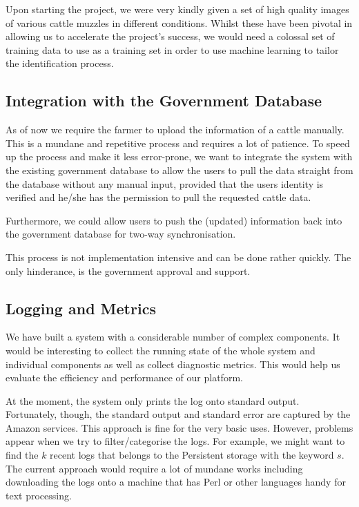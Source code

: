 Upon starting the project, we were very kindly given a set of high quality images of various cattle muzzles in different conditions. Whilst these have been pivotal in allowing us to accelerate the project's success, we would need a colossal set of training data to use as a training set in order to use machine learning to tailor the identification process.

\subsection{Integration with the Government Database}

As of now we require the farmer to upload the information of a cattle manually. This is a mundane and repetitive process and requires a lot of patience. To speed up the process and make it less error-prone, we want to integrate the system with the existing government database to allow the users to pull the data straight from the database without any manual input, provided that the users identity is verified and he/she has the permission to pull the requested cattle data.

Furthermore, we could allow users to push the (updated) information back into the government database for two-way synchronisation.

This process is not implementation intensive and can be done rather quickly. The only hinderance, is the government approval and support.

\subsection{Logging and Metrics}

We have built a system with a considerable number of complex components. It would be interesting to collect the running state of the whole system and individual components as well as collect diagnostic metrics. This would help us evaluate the efficiency and performance of our platform.

At the moment, the system only prints the log onto standard output. Fortunately, though, the standard output and standard error are captured by the Amazon services. This approach is fine for the very basic uses. However, problems appear when we try to filter/categorise the logs. For example, we might want to find the $k$ recent logs that belongs to the Persistent storage with the keyword $s$. The current approach would require a lot of mundane works including downloading the logs onto a machine that has Perl or other languages handy for text processing.

